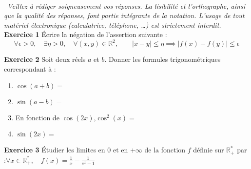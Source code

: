 \documentclass[french,bookmarks]{article}
\begin{document}
    \pagestyle{fancy}
    \fancyhf{}
    \cfoot{\thepage}
    
    \noindent \textsf{}\\[-25pt]
    
    \begin{center}
    \end{center}
    
    \noindent \textit{\triangleright \ Veillez à rédiger soigneusement vos réponses. La lisibilité et l'orthographe, ainsi que la qualité des réponses, font partie intégrante de la notation. L'usage de tout matériel électronique (calculatrice, téléphone, \dots) est strictement interdit.}\\
    
    
    \noindent \textbf{Exercice 1} Écrire la négation de l'assertion suivante :
    \[ \forall \epsilon > 0,\quad \exists \eta > 0,\quad \forall \left(x, y\right) \in \mathbb{R}^2,\qquad \left| x - y\right| \leq \eta \implies \left| f\left(x\right) - f\left(y\right) \right| \leq \epsilon\]
    
    \vspace{6mm}
    
    \noindent \textbf{Exercice 2} Soit deux réels $a$ et $b$. Donner les formules trigonométriques correspondant à :
    \begin{enumerate}
        \item[\bullet] $\cos\left(a + b\right) = $
        
        \item[\bullet] $\sin\left(a - b\right) = $
        
        \item[\bullet] En fonction de $\cos\left(2x\right)$,\quad $\cos^2\left(x\right) =$
        
        \item[\bullet] $\sin\left(2x\right) =$\\
    \end{enumerate}
    
    \noindent \textbf{Exercice 3} Étudier les limites en $0$ et en $+\infty$ de la fonction $f$ définie sur $\mathbb{R}_+^*$ par :\quad $\forall x \in \mathbb{R}_+^*,\quad f\left(x\right) = \frac{1}{x} - \frac{1}{e^x - 1}$
    
    \vspace{20mm}
    
\end{document}
